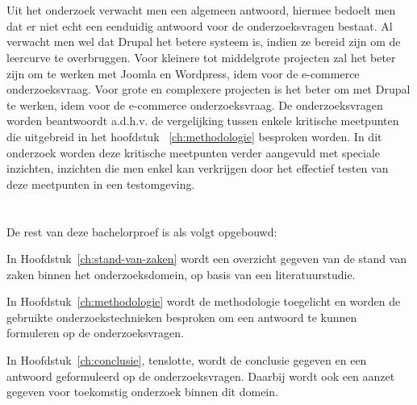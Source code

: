 \section{}
\label{sec:onderzoeksdoelstelling}

Uit het onderzoek verwacht men een algemeen antwoord, hiermee bedoelt men dat er niet echt een eenduidig antwoord voor de onderzoeksvragen bestaat. Al verwacht men wel dat Drupal het betere systeem is, indien ze bereid zijn om de leercurve te overbruggen. Voor kleinere tot middelgrote projecten zal het beter zijn om te werken met Joomla en Wordpress, idem voor de e-commerce onderzoeksvraag. Voor grote en complexere projecten is het beter om met Drupal te werken, idem voor de e-commerce onderzoeksvraag. De onderzoeksvragen worden beantwoordt a.d.h.v. de vergelijking tussen enkele kritische meetpunten die uitgebreid in het hoofdstuk ~\ref{ch:methodologie} besproken worden. In dit onderzoek worden deze kritische meetpunten verder aangevuld met speciale inzichten, inzichten die men enkel kan verkrijgen door het effectief testen van deze meetpunten in een testomgeving.

\section{}
\label{sec:opzet-bachelorproef}


De rest van deze bachelorproef is als volgt opgebouwd:

In Hoofdstuk~\ref{ch:stand-van-zaken} wordt een overzicht gegeven van de stand van zaken binnen het onderzoeksdomein, op basis van een literatuurstudie.

In Hoofdstuk~\ref{ch:methodologie} wordt de methodologie toegelicht en worden de gebruikte onderzoekstechnieken besproken om een antwoord te kunnen formuleren op de onderzoeksvragen.


In Hoofdstuk~\ref{ch:conclusie}, tenslotte, wordt de conclusie gegeven en een antwoord geformuleerd op de onderzoeksvragen. Daarbij wordt ook een aanzet gegeven voor toekomstig onderzoek binnen dit domein.
